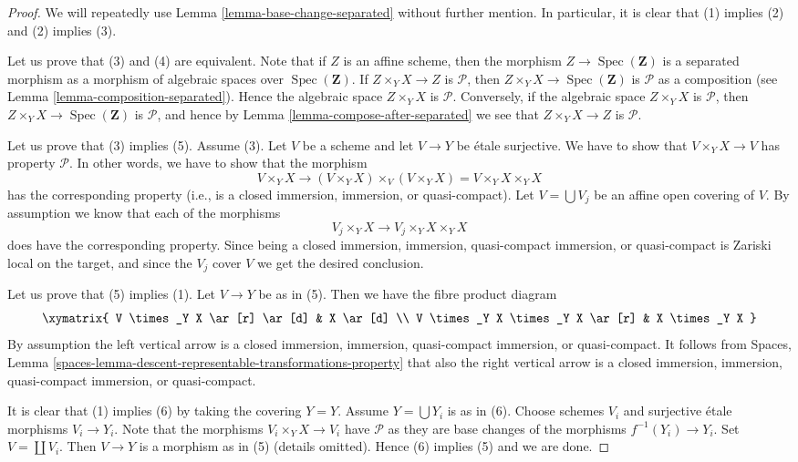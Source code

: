 \documentclass{stacks-project}
\theoremstyle{plain}
\theoremstyle{definition}
\theoremstyle{remark}
\numberwithin{equation}{subsection}
\def\Spec{\mathop{\mathrm{Spec}}}
\begin{document}
\begin{proof}
We will repeatedly use
Lemma \ref{lemma-base-change-separated}
without further mention. In particular, it is clear that
(1) implies (2) and (2) implies (3).

\medskip\noindent
Let us prove that (3) and (4) are equivalent. Note that if $Z$ is an affine
scheme, then the morphism $Z \to \Spec(\mathbf{Z})$ is a separated
morphism as a morphism of algebraic spaces over $\Spec(\mathbf{Z})$.
If $Z \times_Y X \to Z$ is $\mathcal{P}$, then
$Z \times_Y X \to \Spec(\mathbf{Z})$ is $\mathcal{P}$
as a composition (see
Lemma \ref{lemma-composition-separated}). Hence the algebraic
space $Z \times_Y X$ is $\mathcal{P}$. Conversely, if the algebraic
space $Z \times_Y X$ is $\mathcal{P}$, then
$Z \times_Y X \to \Spec(\mathbf{Z})$ is $\mathcal{P}$, and
hence by
Lemma \ref{lemma-compose-after-separated}
we see that $Z \times_Y X \to Z$ is $\mathcal{P}$.

\medskip\noindent
Let us prove that (3) implies (5). Assume (3). Let $V$ be a scheme
and let $V \to Y$ be \'etale surjective. We have to show that
$V \times_Y X \to V$ has property $\mathcal{P}$. In other words,
we have to show that the morphism
$$
V \times_Y X \longrightarrow
(V \times_Y X) \times_V (V \times_Y X) = V \times_Y X \times_Y X
$$
has the corresponding property (i.e., is a closed immersion, immersion,
or quasi-compact). Let $V = \bigcup V_j$ be an
affine open covering of $V$. By assumption we know that each of the morphisms
$$
V_j \times_Y X \longrightarrow V_j \times_Y X \times_Y X
$$
does have the corresponding property. Since being a closed immersion,
immersion, quasi-compact immersion, or quasi-compact is Zariski local
on the target, and since the $V_j$ cover $V$ we get the desired conclusion.

\medskip\noindent
Let us prove that (5) implies (1). Let $V \to Y$ be as in (5).
Then we have the fibre product diagram
$$
\xymatrix{
V \times_Y X \ar[r] \ar[d] &
X \ar[d] \\
V \times_Y X \times_Y X \ar[r] &
X \times_Y X
}
$$
By assumption the left vertical arrow is a closed immersion,
immersion, quasi-compact immersion, or quasi-compact. It follows from
Spaces, Lemma \ref{spaces-lemma-descent-representable-transformations-property}
that also the right vertical arrow is a closed immersion,
immersion, quasi-compact immersion, or quasi-compact.

\medskip\noindent
It is clear that (1) implies (6) by taking the covering $Y = Y$.
Assume $Y = \bigcup Y_i$ is as in (6). Choose schemes $V_i$ and
surjective \'etale morphisms $V_i \to Y_i$. Note that the morphisms
$V_i \times_Y X \to V_i$ have $\mathcal{P}$ as they are base changes
of the morphisms $f^{-1}(Y_i) \to Y_i$. Set $V = \coprod V_i$.
Then $V \to Y$ is a morphism as in (5) (details omitted). Hence
(6) implies (5) and we are done.
\end{proof}
\end{document}
